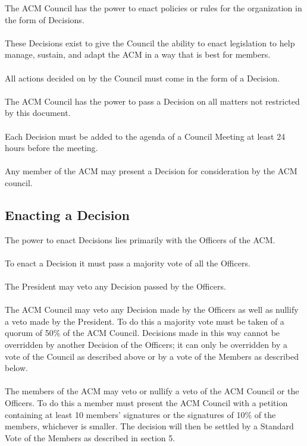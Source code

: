 \documentclass[12pt,titlepage]{article}
\begin{document}
The ACM Council has the power to enact policies or rules for the organization in the form of Decisions.\\
\\
These Decisions exist to give the Council the ability to enact legislation to help manage, sustain, and adapt the ACM in a way that is best for members.\\
\\
All actions decided on by the Council must come in the form of a Decision.\\
\\
The ACM Council has the power to pass a Decision on all matters not restricted by this document.\\
\\
Each Decision must be added to the agenda of a Council Meeting at least 24 hours before the meeting.\\
\\
Any member of the ACM may present a Decision for consideration by the ACM council.

\subsection{Enacting a Decision}

The power to enact Decisions lies primarily with the Officers of the ACM.\\
\\
To enact a Decision it must pass a majority vote of all the Officers.\\
\\
The President may veto any Decision passed by the Officers.\\
\\
The ACM Council may veto any Decision made by the Officers as well as nullify a veto made by the President. To do this a majority vote must be taken of a quorum of 50\% of the ACM Council. Decisions made in this way cannot be overridden by another Decision of the Officers; it can only be overridden by a vote of the Council as described above or by a vote of the Members as described below.\\
\\
The members of the ACM may veto or nullify a veto of the ACM Council or the Officers. To do this a member must present the ACM Council with a petition containing at least 10 members' signatures or the signatures of 10\% of the members, whichever is smaller. The decision will then be settled by a Standard Vote of the Members as described in section 5.
\end{document}
